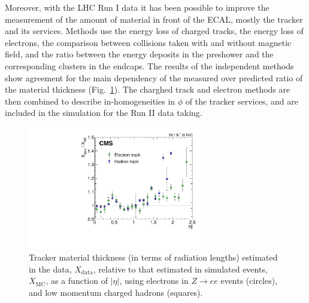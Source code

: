 \documentclass[journal]{IEEEtran}
\begin{document}
Moreover, with the LHC Run I data it has been possible to improve the measurement of the amount of material in front of the ECAL, mostly the tracker and its services. Methods use the energy loss of charged tracks, the energy loss of electrons, the comparison between collisions taken with and without magnetic field, and the ratio between the energy deposits in the preshower and the corresponding clusters in the endcaps. The results of the independent methods show agreement for the main dependency of the measured over predicted ratio of the material thickness (Fig.~\ref{fig:material}). The charghed track and electron methods are then combined to describe in-homogeneities in $\phi$ of the tracker services, and are included in the simulation for the Run II data taking.
%
\begin{figure}[!t]
  \begin{center}
    \includegraphics[width=3.0in]{material}
    \caption{Tracker material thickness (in terms of radiation lengths) estimated in the data, $X_\mathrm{data}$, relative to that estimated in simulated events, $X_\mathrm{MC}$, as a function of $\vert\eta\vert$, using electrons in $Z\to ee$ events (circles), and low momentum charged hadrons (squares). \label{fig:material}}
  \end{center}
\end{figure}
%
\end{document}

